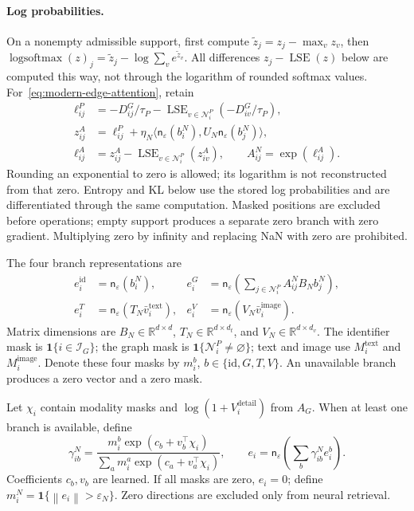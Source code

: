 \documentclass[12pt,a4paper]{article}
\newcommand{\R}{\mathbb R}
\newcommand{\ind}{\mathbf 1}
\newcommand{\eps}{\varepsilon}
\newcommand{\norm}[1]{\left\lVert#1\right\rVert}
\theoremstyle{plainru}
\begin{document}
\paragraph{Log probabilities.}\label{sec:modern-log-probabilities}
On a nonempty admissible support, first compute
$\widetilde z_j=z_j-\max_v z_v$, then
$\operatorname{logsoftmax}(z)_j=\widetilde z_j-\log\sum_v e^{\widetilde z_v}$.
All differences $z_j-\operatorname{LSE}(z)$ below are computed this way,
not through the logarithm of rounded softmax values.
For~\eqref{eq:modern-edge-attention}, retain
\begin{align}\label{eq:modern-edge-log-probabilities}
\ell_{ij}^{P}&=-D_{ij}^{G}/\tau_P
-\operatorname{LSE}_{v\in\mathcal N_i^P}(-D_{iv}^{G}/\tau_P),\\
z_{ij}^{A}&=\ell_{ij}^{P}+\eta_N\langle
\mathsf n_\eps(b_i^N),U_N\mathsf n_\eps(b_j^N)\rangle,\nonumber\\
\ell_{ij}^{A}&=z_{ij}^{A}
-\operatorname{LSE}_{v\in\mathcal N_i^P}(z_{iv}^{A}),\qquad
A_{ij}^N=\exp(\ell_{ij}^{A}).\nonumber
\end{align}
Rounding an exponential to zero is allowed; its logarithm is not reconstructed
from that zero. Entropy and KL below use the stored log probabilities
and are differentiated through the same computation. Masked positions are excluded
before operations; empty support produces a separate zero branch with zero
gradient. Multiplying zero by infinity and replacing NaN with zero are prohibited.

The four branch representations are
\begin{align}\label{eq:modern-item-branches}
e_i^{\mathrm{id}}&=\mathsf n_\eps(b_i^N),&
e_i^{G}&=\mathsf n_\eps\!\left(
\sum_{j\in\mathcal N_i^P}A_{ij}^{N}B_Nb_j^N\right),\\
e_i^{T}&=\mathsf n_\eps(T_N\bar v_i^{\mathrm{text}}),&
e_i^{V}&=\mathsf n_\eps(V_N\bar v_i^{\mathrm{image}}).
\nonumber
\end{align}
Matrix dimensions are $B_N\in\R^{d\times d}$,
$T_N\in\R^{d\times d_t}$, and $V_N\in\R^{d\times d_v}$.
The identifier mask is $\ind\{i\in\mathcal I_G\}$;
the graph mask is $\ind\{\mathcal N_i^P\ne\varnothing\}$;
text and image use $M_i^{\mathrm{text}}$
and $M_i^{\mathrm{image}}$. Denote these four masks by $m_i^b$,
$b\in\{\mathrm{id},G,T,V\}$.
An unavailable branch produces a zero vector and a zero mask.

Let $\chi_i$ contain modality masks and
$\log(1+V_i^{\mathrm{detail}})$ from $A_G$.
When at least one branch is available, define
\begin{equation}\label{eq:modern-item-fusion}
\gamma_{ib}^{N}=
\frac{m_i^b\exp(c_b+v_b^\top\chi_i)}
{\sum_a m_i^a\exp(c_a+v_a^\top\chi_i)},\qquad
e_i=\mathsf n_\eps\!\left(\sum_b\gamma_{ib}^{N}e_i^b\right).
\end{equation}
Coefficients $c_b,v_b$ are learned. If all masks are zero,
$e_i=0$; define $m_i^N=\ind\{\norm{e_i}>\eps_N\}$.
Zero directions are excluded only from neural retrieval.
\end{document}
